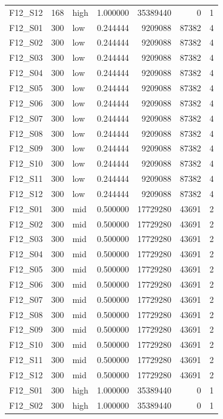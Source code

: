 \begin{longtable}{lllr r r r}
F12\_S12 & 168 & high & 1.000000 & 35389440 & 0 & 1 \\
F12\_S01 & 300 & low & 0.244444 & 9209088 & 87382 & 4 \\
F12\_S02 & 300 & low & 0.244444 & 9209088 & 87382 & 4 \\
F12\_S03 & 300 & low & 0.244444 & 9209088 & 87382 & 4 \\
F12\_S04 & 300 & low & 0.244444 & 9209088 & 87382 & 4 \\
F12\_S05 & 300 & low & 0.244444 & 9209088 & 87382 & 4 \\
F12\_S06 & 300 & low & 0.244444 & 9209088 & 87382 & 4 \\
F12\_S07 & 300 & low & 0.244444 & 9209088 & 87382 & 4 \\
F12\_S08 & 300 & low & 0.244444 & 9209088 & 87382 & 4 \\
F12\_S09 & 300 & low & 0.244444 & 9209088 & 87382 & 4 \\
F12\_S10 & 300 & low & 0.244444 & 9209088 & 87382 & 4 \\
F12\_S11 & 300 & low & 0.244444 & 9209088 & 87382 & 4 \\
F12\_S12 & 300 & low & 0.244444 & 9209088 & 87382 & 4 \\
F12\_S01 & 300 & mid & 0.500000 & 17729280 & 43691 & 2 \\
F12\_S02 & 300 & mid & 0.500000 & 17729280 & 43691 & 2 \\
F12\_S03 & 300 & mid & 0.500000 & 17729280 & 43691 & 2 \\
F12\_S04 & 300 & mid & 0.500000 & 17729280 & 43691 & 2 \\
F12\_S05 & 300 & mid & 0.500000 & 17729280 & 43691 & 2 \\
F12\_S06 & 300 & mid & 0.500000 & 17729280 & 43691 & 2 \\
F12\_S07 & 300 & mid & 0.500000 & 17729280 & 43691 & 2 \\
F12\_S08 & 300 & mid & 0.500000 & 17729280 & 43691 & 2 \\
F12\_S09 & 300 & mid & 0.500000 & 17729280 & 43691 & 2 \\
F12\_S10 & 300 & mid & 0.500000 & 17729280 & 43691 & 2 \\
F12\_S11 & 300 & mid & 0.500000 & 17729280 & 43691 & 2 \\
F12\_S12 & 300 & mid & 0.500000 & 17729280 & 43691 & 2 \\
F12\_S01 & 300 & high & 1.000000 & 35389440 & 0 & 1 \\
F12\_S02 & 300 & high & 1.000000 & 35389440 & 0 & 1 \\

\end{longtable}
